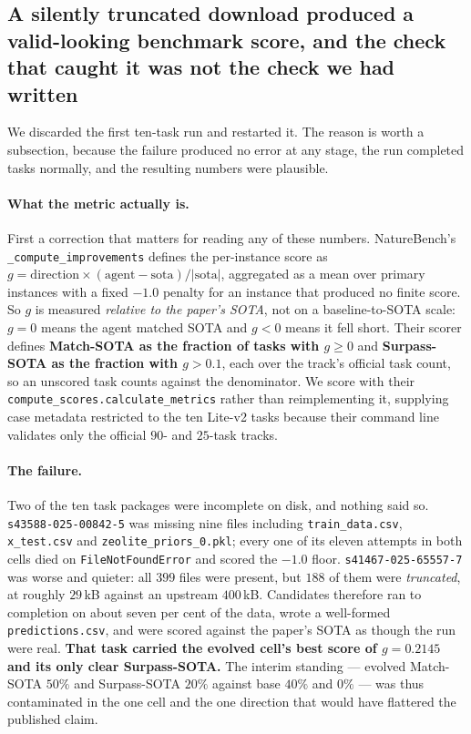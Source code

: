 \subsection{A silently truncated download produced a valid-looking benchmark score, and the
check that caught it was not the check we had written}
\label{sec:openrsidata}

We discarded the first ten-task run and restarted it. The reason is worth a subsection,
because the failure produced no error at any stage, the run completed tasks normally, and the
resulting numbers were plausible.

\paragraph{What the metric actually is.}
First a correction that matters for reading any of these numbers. NatureBench's
\texttt{\_compute\_improvements} defines the per-instance score as
$g = \mathrm{direction} \times (\mathrm{agent} - \mathrm{sota}) / |\mathrm{sota}|$, aggregated
as a mean over primary instances with a fixed $-1.0$ penalty for an instance that produced no
finite score. So $g$ is measured \emph{relative to the paper's SOTA}, not on a
baseline-to-SOTA scale: $g = 0$ means the agent matched SOTA and $g < 0$ means it fell short.
Their scorer defines \textbf{Match-SOTA as the fraction of tasks with $g \ge 0$} and
\textbf{Surpass-SOTA as the fraction with $g > 0.1$}, each over the track's official task
count, so an unscored task counts against the denominator. We score with their
\texttt{compute\_scores.calculate\_metrics} rather than reimplementing it, supplying case
metadata restricted to the ten Lite-v2 tasks because their command line validates only the
official $90$- and $25$-task tracks.

\paragraph{The failure.}
Two of the ten task packages were incomplete on disk, and nothing said so.
\texttt{s43588-025-00842-5} was missing nine files including \texttt{train\_data.csv},
\texttt{x\_test.csv} and \texttt{zeolite\_priors\_0.pkl}; every one of its eleven attempts in
both cells died on \texttt{FileNotFoundError} and scored the $-1.0$ floor.
\texttt{s41467-025-65557-7} was worse and quieter: all $399$ files were present, but $188$ of
them were \emph{truncated}, at roughly $29$\,kB against an upstream $400$\,kB. Candidates
therefore ran to completion on about seven per cent of the data, wrote a well-formed
\texttt{predictions.csv}, and were scored against the paper's SOTA as though the run were
real. \textbf{That task carried the evolved cell's best score of $g = 0.2145$ and its only
clear Surpass-SOTA.} The interim standing --- evolved Match-SOTA $50\%$ and Surpass-SOTA
$20\%$ against base $40\%$ and $0\%$ --- was thus contaminated in the one cell and the one
direction that would have flattered the published claim.

